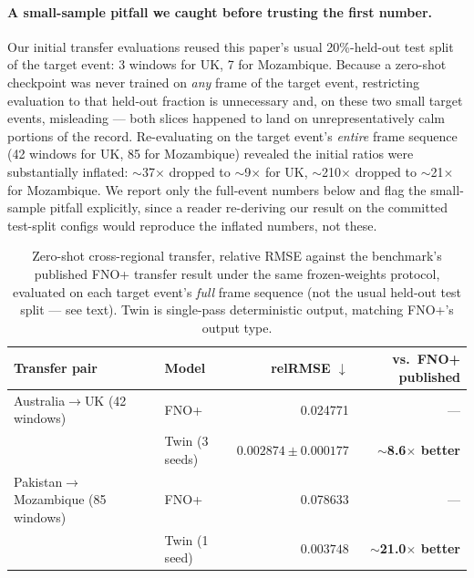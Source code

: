 \documentclass[11pt]{article}
\newcommand{\twin}{\mbox{Twin}}                 %
\begin{document}
\paragraph{A small-sample pitfall we caught before trusting the first
number.} Our initial transfer evaluations reused this paper's usual
20\%-held-out test split of the target event: 3 windows for UK, 7 for
Mozambique. Because a zero-shot checkpoint was never trained on \emph{any}
frame of the target event, restricting evaluation to that held-out
fraction is unnecessary and, on these two small target events, misleading
--- both slices happened to land on unrepresentatively calm portions of
the record. Re-evaluating on the target event's \emph{entire} frame
sequence (42 windows for UK, 85 for Mozambique) revealed the initial
ratios were substantially inflated: $\sim$37$\times$ dropped to
$\sim$9$\times$ for UK, $\sim$210$\times$ dropped to $\sim$21$\times$ for
Mozambique. We report only the full-event numbers below and flag the
small-sample pitfall explicitly, since a reader re-deriving our result on
the committed test-split configs would reproduce the inflated numbers, not
these.

\begin{table}[H]
\centering
\caption{Zero-shot cross-regional transfer, relative RMSE against the
benchmark's published FNO+ transfer result under the same frozen-weights
protocol, evaluated on each target event's \emph{full} frame sequence
(not the usual held-out test split --- see text). \twin{} is single-pass
deterministic output, matching FNO+'s output type.}
\label{tab:zeroshot}
\begin{tabular}{llrr}
\toprule
Transfer pair & Model & relRMSE $\downarrow$ & vs.\ FNO+ published \\
\midrule
Australia$\to$UK (42 windows) & FNO+ \citep{floodcastbench2025} & 0.024771 & --- \\
 & \twin{} (3 seeds) & $\mathbf{0.002874 \pm 0.000177}$ & $\sim$\textbf{8.6$\times$ better} \\
\midrule
Pakistan$\to$Mozambique (85 windows) & FNO+ \citep{floodcastbench2025} & 0.078633 & --- \\
 & \twin{} (1 seed) & $\mathbf{0.003748}$ & $\sim$\textbf{21.0$\times$ better} \\
\bottomrule
\end{tabular}
\end{table}
\end{document}
